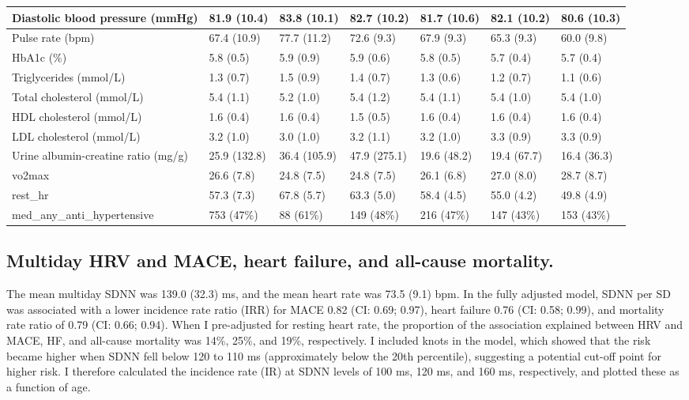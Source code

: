 \documentclass[
  a4paper,
  headsepline=true,
  open=any]{scrbook}
\begin{document}
\begin{table}
{\begin{tabular}{l|l|l|l|l|l|l}
\hline
Diastolic blood pressure (mmHg) & 81.9 (10.4) & 83.8 (10.1) & 82.7 (10.2) & 81.7 (10.6) & 82.1 (10.2) & 80.6 (10.3)\\
\hline
Pulse rate (bpm) & 67.4 (10.9) & 77.7 (11.2) & 72.6 (9.3) & 67.9 (9.3) & 65.3 (9.3) & 60.0 (9.8)\\
\hline
HbA1c (\%) & 5.8 (0.5) & 5.9 (0.9) & 5.9 (0.6) & 5.8 (0.5) & 5.7 (0.4) & 5.7 (0.4)\\
\hline
Triglycerides (mmol/L) & 1.3 (0.7) & 1.5 (0.9) & 1.4 (0.7) & 1.3 (0.6) & 1.2 (0.7) & 1.1 (0.6)\\
\hline
Total cholesterol (mmol/L) & 5.4 (1.1) & 5.2 (1.0) & 5.4 (1.2) & 5.4 (1.1) & 5.4 (1.0) & 5.4 (1.0)\\
\hline
HDL cholesterol (mmol/L) & 1.6 (0.4) & 1.6 (0.4) & 1.5 (0.5) & 1.6 (0.4) & 1.6 (0.4) & 1.6 (0.4)\\
\hline
LDL cholesterol (mmol/L) & 3.2 (1.0) & 3.0 (1.0) & 3.2 (1.1) & 3.2 (1.0) & 3.3 (0.9) & 3.3 (0.9)\\
\hline
Urine albumin-creatine ratio (mg/g) & 25.9 (132.8) & 36.4 (105.9) & 47.9 (275.1) & 19.6 (48.2) & 19.4 (67.7) & 16.4 (36.3)\\
\hline
vo2max & 26.6 (7.8) & 24.8 (7.5) & 24.8 (7.5) & 26.1 (6.8) & 27.0 (8.0) & 28.7 (8.7)\\
\hline
rest\_hr & 57.3 (7.3) & 67.8 (5.7) & 63.3 (5.0) & 58.4 (4.5) & 55.0 (4.2) & 49.8 (4.9)\\
\hline
med\_any\_anti\_hypertensive & 753 (47\%) & 88 (61\%) & 149 (48\%) & 216 (47\%) & 147 (43\%) & 153 (43\%)\\
\hline
\end{tabular}}
\end{table}

\hypertarget{multiday-hrv-and-mace-heart-failure-and-all-cause-mortality.}{%
\subsection{Multiday HRV and MACE, heart failure, and all-cause
mortality.}\label{multiday-hrv-and-mace-heart-failure-and-all-cause-mortality.}}

The mean multiday SDNN was 139.0 (32.3) ms, and the mean heart rate was
73.5 (9.1) bpm. In the fully adjusted model, SDNN per SD was associated
with a lower incidence rate ratio (IRR) for MACE 0.82 (CI: 0.69; 0.97),
heart failure 0.76 (CI: 0.58; 0.99), and mortality rate ratio of 0.79
(CI: 0.66; 0.94). When I pre-adjusted for resting heart rate, the
proportion of the association explained between HRV and MACE, HF, and
all-cause mortality was 14\%, 25\%, and 19\%, respectively. I included
knots in the model, which showed that the risk became higher when SDNN
fell below 120 to 110 ms (approximately below the 20th percentile),
suggesting a potential cut-off point for higher risk. I therefore
calculated the incidence rate (IR) at SDNN levels of 100 ms, 120 ms, and
160 ms, respectively, and plotted these as a function of age.
\end{document}
